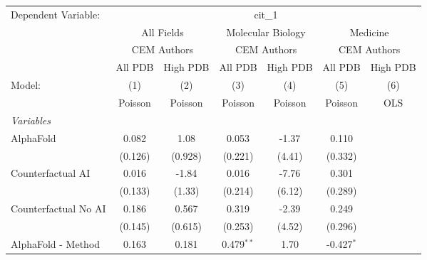 \begingroup
\centering
\begin{tabular}{lcccccc}
   \tabularnewline \midrule \midrule
   Dependent Variable: & \multicolumn{6}{c}{cit\_1}\\
 & \multicolumn{2}{c}{All Fields} & \multicolumn{2}{c}{Molecular Biology} & \multicolumn{2}{c}{Medicine} \\
\cmidrule(lr){2-3} \cmidrule(lr){4-5} \cmidrule(lr){6-7}
 & \multicolumn{2}{c}{CEM Authors} & \multicolumn{2}{c}{CEM Authors} & \multicolumn{2}{c}{CEM Authors} \\
\cmidrule(lr){2-3} \cmidrule(lr){4-5} \cmidrule(lr){6-7}
 & \multicolumn{1}{c}{All PDB} & \multicolumn{1}{c}{High PDB} & \multicolumn{1}{c}{All PDB} & \multicolumn{1}{c}{High PDB} & \multicolumn{1}{c}{All PDB} & \multicolumn{1}{c}{High PDB} \\
\cmidrule(lr){2-2} \cmidrule(lr){3-3} \cmidrule(lr){4-4} \cmidrule(lr){5-5} \cmidrule(lr){6-6} \cmidrule(lr){7-7}
   Model:                                                     & (1)           & (2)          & (3)          & (4)     & (5)          & (6)\\  
                                                              &  Poisson      & Poisson      & Poisson      & Poisson & Poisson      & OLS\\  
   \midrule
   \emph{Variables}\\
   AlphaFold                                                  & 0.082         & 1.08         & 0.053        & -1.37   & 0.110        &   \\   
                                                              & (0.126)       & (0.928)      & (0.221)      & (4.41)  & (0.332)      &   \\   
   Counterfactual AI                                          & 0.016         & -1.84        & 0.016        & -7.76   & 0.301        &   \\   
                                                              & (0.133)       & (1.33)       & (0.214)      & (6.12)  & (0.289)      &   \\   
   Counterfactual No AI                                       & 0.186         & 0.567        & 0.319        & -2.39   & 0.249        &   \\   
                                                              & (0.145)       & (0.615)      & (0.253)      & (4.52)  & (0.296)      &   \\   
   AlphaFold - Method                                         & 0.163         & 0.181        & 0.479$^{**}$ & 1.70    & -0.427$^{*}$ &   \\   

\end{tabular}
